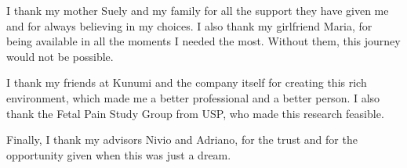 I thank my mother Suely and my family for all the support they have given me and for always believing in my choices. I also thank my girlfriend Maria, for being available in all the moments I needed the most. Without them, this journey would not be possible.

I thank my friends at Kunumi and the company itself for creating this rich environment, which made me a better professional and a better person. I also thank the Fetal Pain Study Group from USP, who made this research feasible. 

Finally, I thank my advisors Nivio and Adriano, for the trust and for the opportunity given when this was just a dream. 